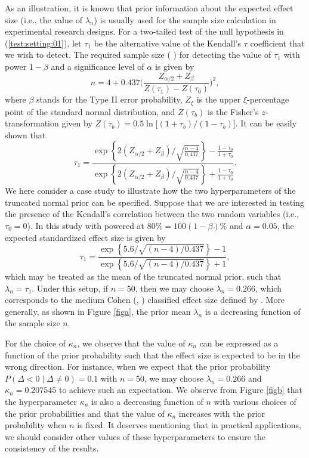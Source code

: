 \documentclass[11pt]{article}
\begin{document}
As an illustration, it is known that prior information about the expected effect size (i.e., the value of $\lambda_n$) is usually used for the sample size calculation in experimental research designs. For a two-tailed test of the null hypothesis in (\ref{test:setting:01}), let $\tau_1$ be the alternative value of the Kendall's $\tau$ coefficient that we wish to detect. The required sample size (\citeauthor{Bone:Wrig:2000} \citeyear{Bone:Wrig:2000}) for detecting the value of $\tau_1$ with power $1-\beta$ and a significance level of $\alpha$ is given by
$$
n = 4 + 0.437\biggl(\frac{Z_{\alpha/2} + Z_{\beta}}{Z(\tau_1) - Z(\tau_0)}\biggr)^2,
$$
where $\beta$ stands for the Type II error probability, $Z_\xi$ is the upper $\xi$-percentage point of the standard normal distribution, and $Z(\tau_{b}) $ is the Fisher's $z$-transformation given by $Z(\tau_{b}) = 0.5\ln\bigr[(1+ \tau_b)/(1 -\tau_b)\bigr]$. It can be easily shown that
$$
\tau_1 = \frac{\exp\left\{{2(Z_{\alpha/2} + Z_{\beta})}/{\sqrt{\frac{n-4}{0.437}}}\right\}- \frac{1 - \tau_{0}}{1 + \tau_{0}}}{\exp\left\{{2(Z_{\alpha/2} + Z_{\beta})}/{\sqrt{\frac{n-4}{0.437}}}\right\} + \frac{1 - \tau_{0}}{1 + \tau_{0}}}.
$$
We here consider a case study to illustrate how the two hyperparameters of the truncated normal prior can be specified. Suppose that we are interested in testing the presence of the Kendall's correlation between the two random variables (i.e., $\tau_0 = 0$). In this study with powered at $80\% = 100(1-\beta)\%$ and $\alpha = 0.05$, the expected standardized effect size is given by
$$
\tau_1 = \frac{\exp\left\{5.6/\sqrt{(n-4)/0.437}\right\}- 1}{\exp\left\{5.6/\sqrt{(n-4)/0.437}\right\} + 1},
$$
which may be treated as the mean of the truncated normal prior, such that $\lambda_n = \tau_1$. Under this setup, if $n = 50$, then we may choose $\lambda_n = 0.266$, which corresponds to the medium Cohen (\citeauthor{Cohen:1988}, \citeyear{Cohen:1988}) classified effect size defined by \cite{botsch2011chapter}.
More generally, as shown in Figure \ref{figa},  the prior mean $\lambda_n$ is a decreasing function of the sample size $n$.

For the choice of $\kappa_n$, we observe that the value of $\kappa_n$ can be expressed as a function of the prior probability such that the effect size is expected to be in the wrong direction. For instance, when we expect that the prior probability $P(\Delta < 0 \mid \Delta \neq 0)  = 0.1$ with  $n=50$,  we may choose $\lambda_n = 0.266$ and $\kappa_n = 0.207545$ to achieve such an expectation. We observe from Figure \ref{figb} that the hyperparameter $\kappa_n$ is also a decreasing function of $n$ with various choices of the prior probabilities and that the value of $\kappa_n$ increases with the prior probability when $n$ is fixed. It deserves mentioning that in practical applications, we should consider other values of these hyperparameters to ensure the consistency of the results.
\end{document}
